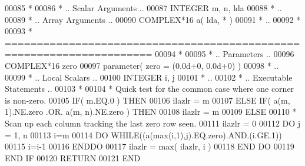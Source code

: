 \begin{DoxyCode}
00085 \textcolor{comment}{*}
00086 \textcolor{comment}{*     .. Scalar Arguments ..}
00087       \textcolor{keywordtype}{INTEGER}            m, n, lda
00088 \textcolor{comment}{*     ..}
00089 \textcolor{comment}{*     .. Array Arguments ..}
00090       \textcolor{keywordtype}{COMPLEX*16}         a( lda, * )
00091 \textcolor{comment}{*     ..}
00092 \textcolor{comment}{*}
00093 \textcolor{comment}{*  =====================================================================}
00094 \textcolor{comment}{*}
00095 \textcolor{comment}{*     .. Parameters ..}
00096       \textcolor{keywordtype}{COMPLEX*16}       zero
00097       parameter( zero = (0.0d+0, 0.0d+0) )
00098 \textcolor{comment}{*     ..}
00099 \textcolor{comment}{*     .. Local Scalars ..}
00100       \textcolor{keywordtype}{INTEGER} i, j
00101 \textcolor{comment}{*     ..}
00102 \textcolor{comment}{*     .. Executable Statements ..}
00103 \textcolor{comment}{*}
00104 \textcolor{comment}{*     Quick test for the common case where one corner is non-zero.}
00105       \textcolor{keywordflow}{IF}( m.EQ.0 ) \textcolor{keywordflow}{THEN}
00106          ilazlr = m
00107       \textcolor{keywordflow}{ELSE} \textcolor{keywordflow}{IF}( a(m, 1).NE.zero .OR. a(m, n).NE.zero ) \textcolor{keywordflow}{THEN}
00108          ilazlr = m
00109       \textcolor{keywordflow}{ELSE}
00110 \textcolor{comment}{*     Scan up each column tracking the last zero row seen.}
00111          ilazlr = 0
00112          \textcolor{keywordflow}{DO} j = 1, n
00113             i=m
00114             \textcolor{keywordflow}{DO} \textcolor{keywordflow}{WHILE}((a(max(i,1),j).EQ.zero).AND.(i.GE.1))
00115                i=i-1
00116 \textcolor{keywordflow}{            ENDDO}
00117             ilazlr = max( ilazlr, i )
00118 \textcolor{keywordflow}{         END DO}
00119 \textcolor{keywordflow}{      END IF}
00120       \textcolor{keywordflow}{RETURN}
00121 \textcolor{keyword}{      END}
\end{DoxyCode}
